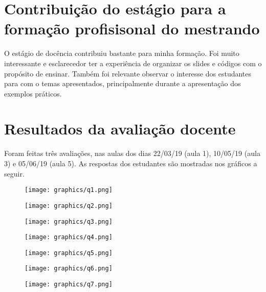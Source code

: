 \documentclass[
	12pt,				%
	openright,			%
	oneside,			%
	a4paper,			%
	chapter=TITLE,		%
	section=TITLE,		%
	english,			%
	french,				%
	spanish,			%
	brazil				%
	]{abntex2}
\begin{document}
\section{Contribuição do estágio para a formação profisisonal do mestrando}

O estágio de docência contribuiu bastante para minha formação.
Foi muito interessante e esclarecedor ter a experiência de organizar os slides e códigos com o propósito de ensinar.
Também foi relevante observar o interesse dos estudantes para com o temas apresentados, principalmente durante a apresentação dos exemplos práticos.

\section{Resultados da avaliação docente}

Foram feitas três avaliações, nas aulas dos dias 22/03/19 (aula 1), 10/05/19 (aula 3) e 05/06/19 (aula 5). As respostas dos estudantes são mostradas nos gráficos a seguir.

\begin{figure}
	\centering
	\texttt{[image: graphics/q1.png]}
\end{figure}

\begin{figure}
	\centering
	\texttt{[image: graphics/q2.png]}
\end{figure}

\begin{figure}
	\centering
	\texttt{[image: graphics/q3.png]}
\end{figure}

\begin{figure}
	\centering
	\texttt{[image: graphics/q4.png]}
\end{figure}

\begin{figure}
	\centering
	\texttt{[image: graphics/q5.png]}
\end{figure}

\begin{figure}
	\centering
	\texttt{[image: graphics/q6.png]}
\end{figure}

\begin{figure}
	\centering
	\texttt{[image: graphics/q7.png]}
\end{figure}
\end{document}
